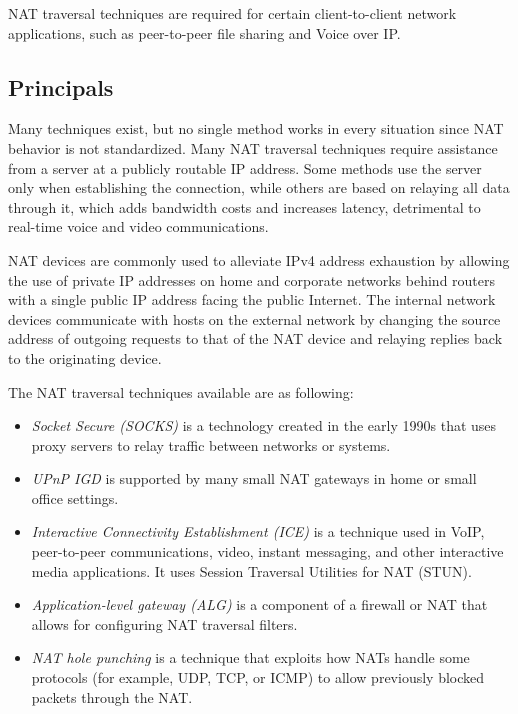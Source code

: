 NAT traversal techniques are required for certain client-to-client network applications, such as peer-to-peer file sharing and Voice over IP.\cite{stiemerling2008nat}


\subsection{Principals}

Many techniques exist, but no single method works in every situation since NAT behavior is not standardized. Many NAT traversal techniques require assistance from a server at a publicly routable IP address\cite{rosenberg2003stun}. Some methods use the server only when establishing the connection, while others are based on relaying all data through it, which adds bandwidth costs and increases latency, detrimental to real-time voice and video communications.

NAT devices are commonly used to alleviate IPv4 address exhaustion\cite{alqahtaniipv4} by allowing the use of private IP addresses on home and corporate networks behind routers with a single public IP address facing the public Internet. The internal network devices communicate with hosts on the external network by changing the source address of outgoing requests to that of the NAT device and relaying replies back to the originating device.

The NAT traversal techniques available are as following:
\begin{itemize}
  \item \textit{Socket Secure (SOCKS)} is a technology created in the early 1990s that uses proxy servers to relay traffic between networks or systems.
  \item \textit{UPnP IGD} is supported by many small NAT gateways in home or small office settings.
  \item \textit{Interactive Connectivity Establishment (ICE)} is a technique used in VoIP, peer-to-peer communications, video, instant messaging, and other interactive media applications. It uses Session Traversal Utilities for NAT (STUN).
  \item \textit{Application-level gateway (ALG)} is a component of a firewall or NAT that allows for configuring NAT traversal filters.\cite{hu2005nat}
  \item \textit{NAT hole punching} is a technique that exploits how NATs handle some protocols (for example, UDP, TCP, or ICMP) to allow previously blocked packets through the NAT.
\end{itemize}

